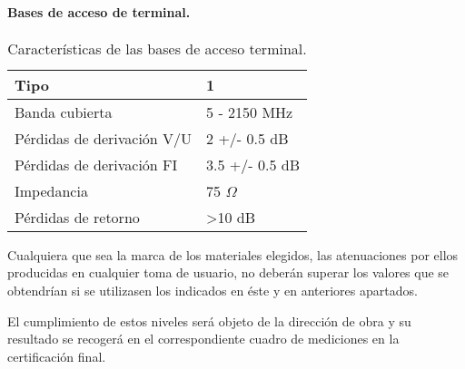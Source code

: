 \paragraph{Bases de acceso de terminal.}

\begin{table}[H]
\caption{Características de las bases de acceso terminal.}
\centering
\label{caracBATs}
\begin{tabular}{l l }
    Tipo & 1\\
    \hline \hline
    Banda cubierta & 5 - 2150 MHz \\
    Pérdidas de derivación V/U & 2 +/- 0.5 dB \\
    Pérdidas de derivación FI & 3.5 +/- 0.5 dB \\
    Impedancia & 75 $\Omega$ \\
    Pérdidas de retorno & >10 dB \\
\end{tabular}
\end{table}

Cualquiera que sea la marca de los materiales elegidos, las atenuaciones por ellos producidas en cualquier toma de usuario, no deberán superar los valores que se obtendrían si se utilizasen los indicados en éste y en anteriores apartados.

El cumplimiento de estos niveles será objeto de la dirección de obra y su resultado se recogerá en
el correspondiente cuadro de mediciones en la certificación final.

